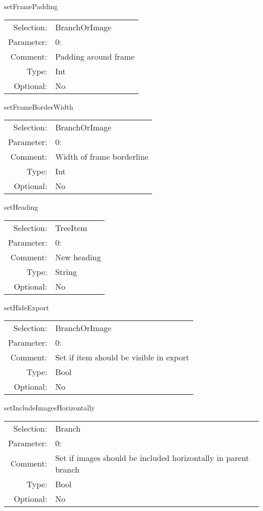 \item setFramePadding\\
\begin{tabular}{rl}
  Selection: & BranchOrImage\\
   Parameter: &  0:\\
        Comment: & Padding around frame\\
           Type: & Int\\
       Optional: &  No\\
\end{tabular}

\item setFrameBorderWidth\\
\begin{tabular}{rl}
  Selection: & BranchOrImage\\
   Parameter: &  0:\\
        Comment: & Width of frame borderline\\
           Type: & Int\\
       Optional: &  No\\
\end{tabular}

\item setHeading\\
\begin{tabular}{rl}
  Selection: & TreeItem\\
   Parameter: &  0:\\
        Comment: & New heading\\
           Type: & String\\
       Optional: &  No\\
\end{tabular}

\item setHideExport\\
\begin{tabular}{rl}
  Selection: & BranchOrImage\\
   Parameter: &  0:\\
        Comment: & Set if item should be visible in export\\
           Type: & Bool\\
       Optional: &  No\\
\end{tabular}

\item setIncludeImagesHorizontally\\
\begin{tabular}{rl}
  Selection: & Branch\\
   Parameter: &  0:\\
        Comment: & Set if images should be included horizontally in parent branch\\
           Type: & Bool\\
       Optional: &  No\\
\end{tabular}

